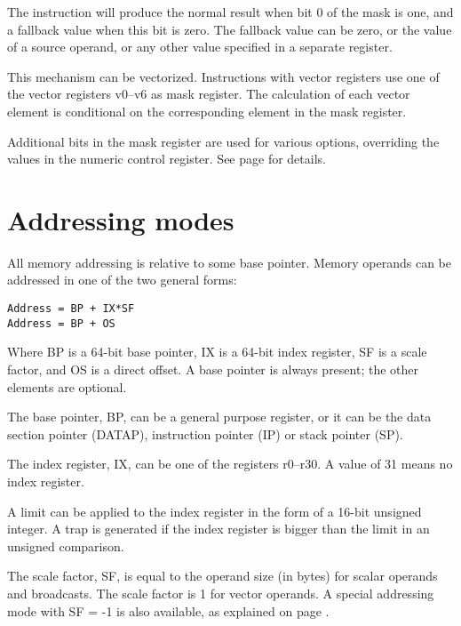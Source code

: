\documentclass[forwardcom.tex]{subfiles}
\begin{document}
The instruction will produce the normal result when bit 0 of the mask is one, and a fallback value when this bit is zero. The fallback value can be zero, or the value of a source operand, or any other value specified in a separate register.
\vspace{2mm}

This mechanism can be vectorized. Instructions with vector registers use one of the vector registers v0--v6 as mask register. The calculation of each vector element is conditional on the corresponding element in the mask register.
\vspace{2mm}

Additional bits in the mask register are used for various options, overriding the values in the numeric control register. See page \pageref{table:maskBits} for details.

\section{Addressing modes}
All memory addressing is relative to some base pointer. Memory operands can be addressed in one of the two general forms:

\begin{lstlisting}
Address = BP + IX*SF
Address = BP + OS
\end{lstlisting}

Where BP is a 64-bit base pointer, IX is a 64-bit index register, SF is a scale factor, and OS is a direct offset. A base pointer is always present; the other elements are optional. 
\vspace{2mm}

The base pointer, BP, can be a general purpose register, or it can be the data section pointer (DATAP), instruction pointer (IP) or stack pointer (SP).
\vspace{2mm}

The index register, IX, can be one of the registers r0--r30. A value of 31 means no index register.
\vspace{2mm}

A limit can be applied to the index register in the form of a 16-bit unsigned integer. A trap is generated if the index register is bigger than the limit in an unsigned comparison.
\vspace{2mm}

The scale factor, SF, is equal to the operand size (in bytes) for scalar operands and broadcasts. The scale factor is 1 for vector operands. A special addressing mode with 
SF = -1 
is also available, as explained on page \pageref{vectorLoops}.
\vspace{2mm}
\end{document}
